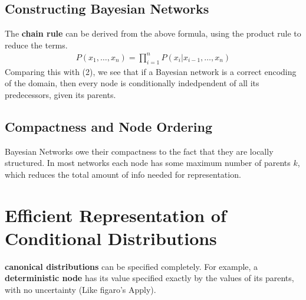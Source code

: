 \documentclass[12pt]{article}
\begin{document}
\subsection{Constructing Bayesian Networks}
The \textbf{chain rule} can be derived from the above formula,
using the product rule to reduce the terms.
\begin{align}
  P(x_1, \dots, x_n) = \prod_{i=1}^n P(x_i | x_{i-1}, \dots, x_n)
\end{align}
Comparing this with (2), we see that if a Bayesian network is
a correct encoding of the domain, then every node is conditionally
indedpendent of all its predecessors, given its parents.

\subsection{Compactness and Node Ordering}
Bayesian Networks owe their compactness to the fact that they are
locally structured. In most networks each node has some maximum
number of parents $k$, which reduces the total amount of info
needed for representation.

\section{Efficient Representation of Conditional Distributions}
\textbf{canonical distributions} can be specified completely. For example,
a \textbf{deterministic node} has its value specified exactly by the values
of its parents, with no uncertainty (Like figaro's Apply).
\end{document}

